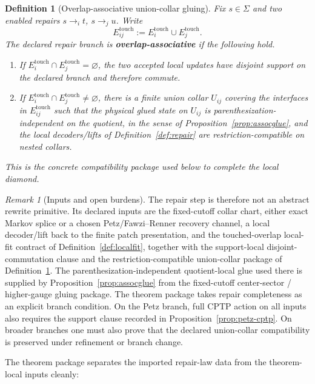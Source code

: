 \documentclass[11pt]{article}
\newtheorem{definition}[theorem]{Definition}
\theoremstyle{remark}
\newtheorem{remark}[theorem]{Remark}
\theoremstyle{plain}
\begin{document}
\begin{definition}[Overlap-associative union-collar gluing]\label{def:assoc}
Fix \(s\in\Sigma\) and two enabled repairs \(s\to_i t\), \(s\to_j u\). Write
\[
E_{ij}^{\mathrm{touch}}
:=
E_i^{\mathrm{touch}}\cup E_j^{\mathrm{touch}}.
\]
The declared repair branch is \textbf{overlap-associative} if the following hold.
\begin{enumerate}[label=(\roman*),leftmargin=2em]
\item If \(E_i^{\mathrm{touch}}\cap E_j^{\mathrm{touch}}=\varnothing\), the two accepted local
updates have disjoint support on the declared branch and therefore commute.
\item If \(E_i^{\mathrm{touch}}\cap E_j^{\mathrm{touch}}\neq\varnothing\), there is a finite union
collar \(U_{ij}\) covering the interfaces in \(E_{ij}^{\mathrm{touch}}\) such that the physical
glued state on \(U_{ij}\) is parenthesization-independent on the quotient, in the sense of
Proposition~\ref{prop:assocglue}, and the local decoders/lifts of
Definition~\ref{def:repair} are restriction-compatible on nested collars.
\end{enumerate}
This is the concrete compatibility package used below to complete the local diamond.
\end{definition}

\begin{remark}[Inputs and open burdens]\label{rem:repair-burdens}
The repair step is therefore not an abstract rewrite primitive. Its declared inputs are the
fixed-cutoff collar chart, either exact Markov splice or a chosen Petz/Fawzi--Renner recovery
channel, a local decoder/lift back to the finite patch presentation, and the touched-overlap
local-fit contract of Definition~\ref{def:localfit}, together with the support-local
disjoint-commutation clause and the restriction-compatible union-collar package of
Definition~\ref{def:assoc}. The
parenthesization-independent quotient-local glue used there is supplied by
Proposition~\ref{prop:assocglue} from the fixed-cutoff center-sector / higher-gauge gluing
package. The theorem package takes repair completeness as an explicit branch condition.
On the Petz branch, full CPTP action on all inputs also requires the support clause
recorded in Proposition~\ref{prop:petz-cptp}. On broader branches one must also prove that
the declared union-collar compatibility is preserved under refinement or branch change.
\end{remark}

The theorem package separates the imported repair-law data from the theorem-local inputs cleanly:
\end{document}
